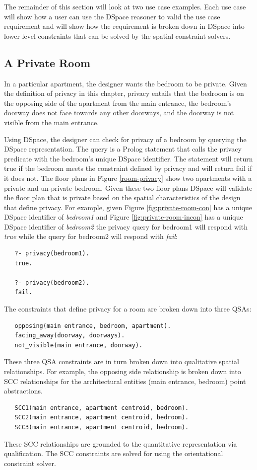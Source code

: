 \documentclass[12pt]{ucthesis}
\begin{document}
The remainder of this section will look at two use case examples. Each use case will show how a user can use the DSpace reasoner to valid the use case requirement and will show how the requirement is broken down in DSpace into lower level constraints that can be solved by the spatial constraint solvers.

\subsection{A Private Room}
In a particular apartment, the designer wants the bedroom to be private. Given the definition of privacy in this chapter, privacy entails that the bedroom is on the opposing side of the apartment from the main entrance, the bedroom's doorway does not face towards any other doorways, and the doorway is not visible from the main entrance.

Using DSpace, the designer can check for privacy of a bedroom by querying the DSpace representation. The query is a Prolog statement that calls the privacy predicate with the bedroom's unique DSpace identifier. The statement will return true if the bedroom meets the constraint defined by privacy and will return fail if it does not. The floor plans in Figure \ref{room-privacy} show two apartments with a private and un-private bedroom. Given these two floor plans DSpace will validate the floor plan that is private based on the spatial characteristics of the design that define privacy. For example, given Figure \ref{fig:private-room-con} has a unique DSpace identifier of \emph{bedroom1} and Figure \ref{fig:private-room-incon} has a unique DSpace identifier of \emph{bedroom2} the privacy query for bedroom1 will respond with \emph{true} while the query for bedroom2 will respond with \emph{fail}: 
\begin{verbatim}
   ?- privacy(bedroom1).
   true.
   
   ?- privacy(bedroom2).
   fail.
\end{verbatim}

The constraints that define privacy for a room are broken down into three QSAs:
\begin{verbatim}
   opposing(main entrance, bedroom, apartment).
   facing_away(doorway, doorways).
   not_visible(main entrance, doorway).
\end{verbatim}
These three QSA constraints are in turn broken down into qualitative spatial relationships. For example, the opposing side relationship is broken down into SCC relationships for the architectural entities (main entrance, bedroom) point abstractions.
\begin{verbatim}
   SCC1(main entrance, apartment centroid, bedroom).
   SCC2(main entrance, apartment centroid, bedroom).
   SCC3(main entrance, apartment centroid, bedroom).
\end{verbatim}
These SCC relationships are grounded to the quantitative representation via qualification. The SCC constraints are solved for using the orientational constraint solver.
\end{document}
